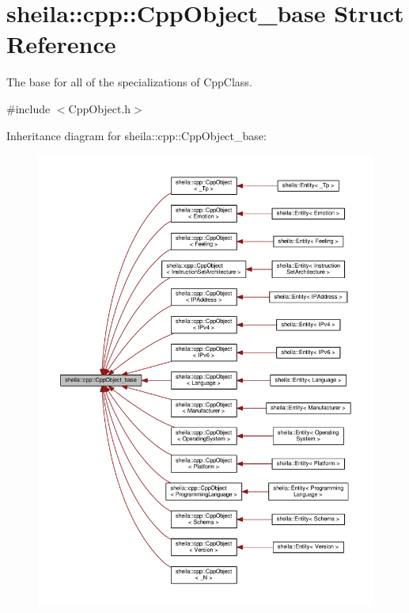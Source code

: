 \hypertarget{structsheila_1_1cpp_1_1CppObject__base}{}\section{sheila\+:\+:cpp\+:\+:Cpp\+Object\+\_\+base Struct Reference}
\label{structsheila_1_1cpp_1_1CppObject__base}


The base for all of the specializations of {\ttfamily Cpp\+Class}.  




{\ttfamily \#include $<$Cpp\+Object.\+h$>$}



Inheritance diagram for sheila\+:\+:cpp\+:\+:Cpp\+Object\+\_\+base\+:
\nopagebreak
\begin{figure}[H]
\begin{center}
\leavevmode
\includegraphics[width=350pt]{structsheila_1_1cpp_1_1CppObject__base__inherit__graph}
\end{center}
\end{figure}
